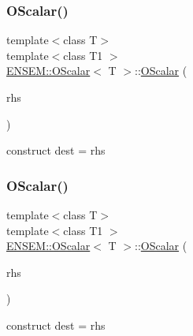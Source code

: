 \subsubsection{\texorpdfstring{OScalar()}{OScalar()}\hspace{0.1cm}{\footnotesize\ttfamily [9/18]}}
{\footnotesize\ttfamily template$<$class T$>$ \\
template$<$class T1 $>$ \\
\mbox{\hyperlink{classENSEM_1_1OScalar}{E\+N\+S\+E\+M\+::\+O\+Scalar}}$<$ T $>$\+::\mbox{\hyperlink{classENSEM_1_1OScalar}{O\+Scalar}} (\begin{DoxyParamCaption}\item[{const \mbox{\hyperlink{classENSEM_1_1OScalar}{O\+Scalar}}$<$ T1 $>$ \&}]{rhs }\end{DoxyParamCaption})\hspace{0.3cm}{\ttfamily [inline]}}



construct dest = rhs 

\mbox{\label{classENSEM_1_1OScalar_a63525278c1ba085f57cdc4aafe50aaa9}} 
\subsubsection{\texorpdfstring{OScalar()}{OScalar()}\hspace{0.1cm}{\footnotesize\ttfamily [10/18]}}
{\footnotesize\ttfamily template$<$class T$>$ \\
template$<$class T1 $>$ \\
\mbox{\hyperlink{classENSEM_1_1OScalar}{E\+N\+S\+E\+M\+::\+O\+Scalar}}$<$ T $>$\+::\mbox{\hyperlink{classENSEM_1_1OScalar}{O\+Scalar}} (\begin{DoxyParamCaption}\item[{const T1 \&}]{rhs }\end{DoxyParamCaption})\hspace{0.3cm}{\ttfamily [inline]}}



construct dest = rhs 

\mbox{\label{classENSEM_1_1OScalar_a9bc3830b1a4af2e67da73871396ae06c}} 
